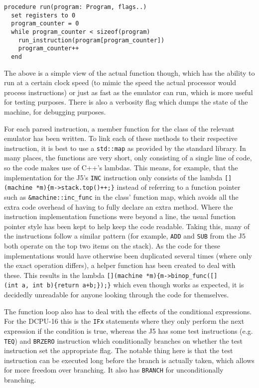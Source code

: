 \begin{lstlisting}[caption={Running a DCPU-16 program}]
procedure run(program: Program, flags..)
  set registers to 0
  program_counter = 0
  while program_counter < sizeof(program)
    run_instruction(program[program_counter])
    program_counter++
  end
\end{lstlisting}

The above is a simple view of the actual function though, which has the ability
to run at a certain clock speed (to mimic the speed the actual processor would
process instructions) or just as fast as the emulator can run, which is more
useful for testing purposes. There is also a verbosity flag which dumps the
state of the machine, for debugging purposes.

For each parsed instruction, a member function for the class of the relevant
emulator has been written. To link each of these methods to their respective
instruction, it is best to use a \texttt{std::map} as provided by the standard
library. In many places, the functions are very short, only consisting of a
single line of code, so the code makes use of C++'s lambdas. This means, for
example, that the implementation for the J5's \texttt{INC} instruction only
consists of the lambda \texttt{[](machine~*m)\{m->stack.top()++;\}} instead of
referring to a function pointer such as \lstinline{&machine::inc_func} in the
class' function map, which avoids all the extra code overhead of having to fully
declare an extra method. Where the instruction implementation functions were
beyond a line, the usual function pointer style has been kept to help keep the
code readable. Taking this, many of the instructions follow a similar pattern
(for example, \texttt{ADD} and \texttt{SUB} from the J5 both operate on the top
two items on the stack). As the code for these implementations would have
otherwise been duplicated several times (where only the exact operation
differs), a helper function has been created to deal with these. This results in
the lambda \texttt{[](machine~*m)\{m->binop\_func([](int~a,~int~b)\{return
a+b;\});\}} which even though works as expected, it is decidedly unreadable for
anyone looking through the code for themselves.

The function loop also has to deal with the effects of the conditional
expressions. For the DCPU-16 this is the \texttt{IFx} statements where they only
perform the next expression if the condition is true, whereas the J5 has some
test instructions (e.g. \texttt{TEQ}) and \texttt{BRZERO} instruction which
conditionally branches on whether the test instruction set the appropriate flag.
The notable thing here is that the test instruction can be executed long before
the branch is actually taken, which allows for more freedom over branching. It
also has \texttt{BRANCH} for unconditionally branching.

